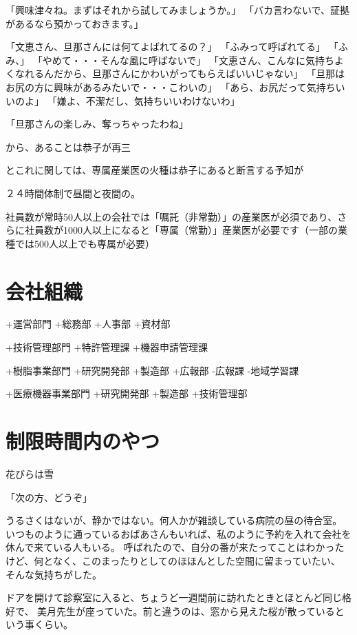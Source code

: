 「興味津々ね。まずはそれから試してみましょうか。」
「バカ言わないで、証拠があるなら預かっておきます。」


「文恵さん、旦那さんには何てよばれてるの？」
「ふみって呼ばれてる」
「ふみ、」
「やめて・・・そんな風に呼ばないで」
「文恵さん、こんなに気持ちよくなれるんだから、旦那さんにかわいがってもらえばいいじゃない」
「旦那はお尻の方に興味があるみたいで・・・こわいの」
「あら、お尻だって気持ちいいのよ」
「嫌よ、不潔だし、気持ちいいわけないわ」


「旦那さんの楽しみ、奪っちゃったわね」


から、あることは恭子が再三


とこれに関しては、専属産業医の火種は恭子にあると断言する予知が




２４時間体制で昼間と夜間の。


社員数が常時50人以上の会社では「嘱託（非常勤）」の産業医が必須であり、さらに社員数が1000人以上になると「専属（常勤）」産業医が必要です（一部の業種では500人以上でも専属が必要）







\section{会社組織}

+運営部門
 +総務部
 +人事部
 +資材部

+技術管理部門
 +特許管理課
 +機器申請管理課

+樹脂事業部門
 +研究開発部
 +製造部
 +広報部
 -広報課
 -地域学習課

+医療機器事業部門
 +研究開発部
 +製造部
 +技術管理部


\section{制限時間内のやつ}
花びらは雪

「次の方、どうぞ」

うるさくはないが、静かではない。何人かが雑談している病院の昼の待合室。
いつものように通っているおばあさんもいれば、私のように予約を入れて会社を休んで来ている人もいる。
呼ばれたので、自分の番が来たってことはわかったけど、何となく、このまったりとしてのほほんとした空間に留まっていたい、
そんな気持ちがした。

ドアを開けて診察室に入ると、ちょうど一週間前に訪れたときとほとんど同じ格好で、
美月先生が座っていた。前と違うのは、窓から見えた桜が散っているという事くらい。

